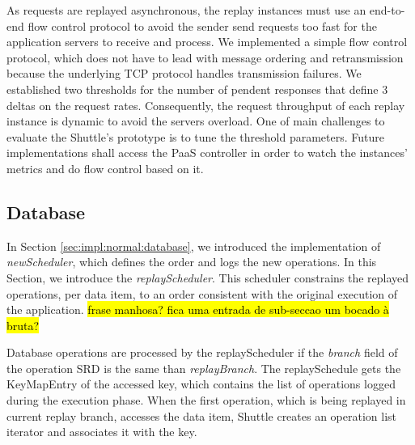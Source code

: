 


As requests are replayed asynchronous, the replay instances must use an end-to-end flow control protocol to avoid the sender send requests too fast for the application servers to receive and process. We implemented a simple flow control protocol, which does not have to lead with message ordering and retransmission because the underlying \ac{TCP} protocol handles transmission failures. We established two thresholds for the number of pendent responses that define 3 deltas on the request rates. Consequently, the request throughput of each replay instance is dynamic to avoid the servers overload. One of main challenges to evaluate the Shuttle's prototype is to tune the threshold parameters. Future implementations shall access the \ac{PaaS} controller in order to watch the instances' metrics and do flow control based on it.\\


\subsection{Database}\label{sec:impl:recovery:database}
In Section \ref{sec:impl:normal:database}, we introduced the implementation of \emph{newScheduler}, which defines the order and logs the new operations. In this Section, we introduce the \emph{replayScheduler}. This scheduler constrains the replayed operations, per data item, to an order consistent with the original execution of the application. \hl{frase manhosa? fica uma entrada de sub-seccao um bocado à bruta?}

Database operations are processed by the replayScheduler if the \emph{branch} field of the operation \ac{SRD} is the same than \emph{replayBranch}. The replaySchedule gets the KeyMapEntry of the accessed key, which contains the list of operations logged during the execution phase. When the first operation, which is being replayed in current replay branch, accesses the data item, Shuttle creates an operation list iterator and associates it with the key.

